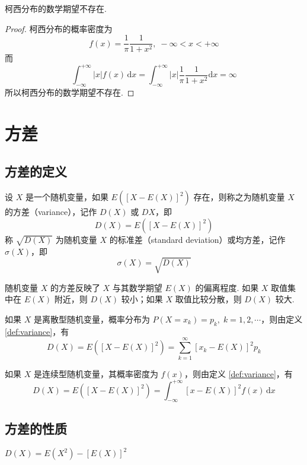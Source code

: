 \begin{conclusion}
    \indent 柯西分布的数学期望不存在.
\end{conclusion}

\begin{proof}
    柯西分布的概率密度为
    $$
    f(x) = \dfrac{1}{\pi} \dfrac{1}{1 + x^2},\; -\infty < x < +\infty
    $$
    而
    $$
    \int_{-\infty}^{+\infty} |x| f(x)\,\text{d}x = \int_{-\infty}^{+\infty} |x| \dfrac{1}{\pi} \dfrac{1}{1 + x^2} \text{d}x = \infty
    $$
    所以柯西分布的数学期望不存在.
\end{proof}

\section{方差}

\subsection{方差的定义}

\begin{definition}
    \indent 设 $X$ 是一个随机变量，如果 $E([X-E(X)]^2)$ 存在，则称之为随机变量 $X$ 的{\heiti 方差}（variance），记作 $D(X)$ 或 $DX$，即
    $$
    D(X) = E([X-E(X)]^2)
    $$
    称 $\sqrt{D(X)}$ 为随机变量 $X$ 的{\heiti 标准差}（standard deviation）或{\heiti 均方差}，记作 $\sigma(X)$，即
    $$
    \sigma(X) = \sqrt{D(X)}
    $$
\end{definition}

随机变量 $X$ 的方差反映了 $X$ 与其数学期望 $E(X)$ 的偏离程度. 如果 $X$ 取值集中在 $E(X)$ 附近，则 $D(X)$ 较小；如果 $X$ 取值比较分散，则 $D(X)$ 较大.

如果 $X$ 是离散型随机变量，概率分布为 $P(X=x_k) = p_k, \; k=1,2,\cdots$，则由定义 \ref{def:variance}，有
$$
D(X) = E([X-E(X)]^2) = \sum_{k=1}^{\infty} [x_k - E(X)]^2 p_k
$$

如果 $X$ 是连续型随机变量，其概率密度为 $f(x)$，则由定义 \ref{def:variance}，有
$$
D(X) = E([X-E(X)]^2) = \int_{-\infty}^{+\infty} [x - E(X)]^2 f(x) \, \text{d}x
$$

\subsection{方差的性质}

\begin{property}
    \indent $D(X) = E(X^2) - [E(X)]^2$
\end{property}


